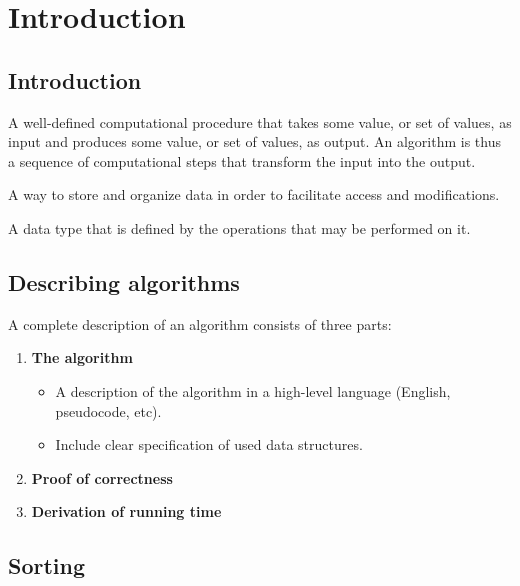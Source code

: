 \section{Introduction}

\subsection{Introduction}

\begin{definition}[Algorithm]
    A well-defined computational procedure that takes some value, or set of
    values, as input and produces some value, or set of values, as output. An
    algorithm is thus a sequence of computational steps that transform the
    input into the output.
\end{definition}

\begin{definition}
    A way to store and organize data in order to facilitate access and modifications.
\end{definition}

\begin{definition}
    A data type that is defined by the operations that may be performed on it.
\end{definition}

\subsection{Describing algorithms}
A complete description of an algorithm consists of three parts:
\begin{enumerate}
    \item \textbf{The algorithm}
        \begin{itemize}
            \item A description of the algorithm in a high-level language (English, pseudocode, etc).
            \item Include clear specification of used data structures.
        \end{itemize}
    \item \textbf{Proof of correctness}
    \item \textbf{Derivation of running time}
\end{enumerate}

\subsection{Sorting}


